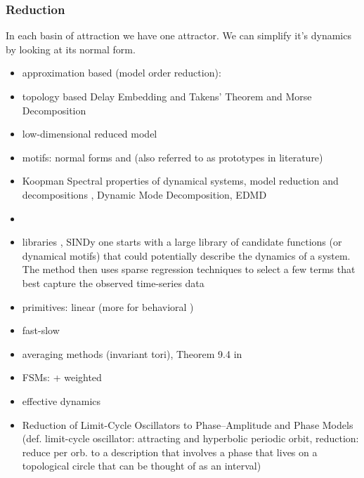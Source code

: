 \documentclass{article}
\theoremstyle{definition} \newtheorem{definition}{Definition}  \newtheorem{example}{Example}
\theoremstyle{remark} \newtheorem{remark}{Remark}
\newcounter{ct}
\begin{document}
\subsubsection{Reduction}\label{sec:reduction} %
In each basin of attraction we have one attractor.
We can simplify it's dynamics by looking at its normal form.

\begin{itemize}
\item approximation based (model order reduction): \citep{schilders2008model}
\item topology based Delay Embedding and Takens' Theorem  and Morse Decomposition 
\item low-dimensional reduced model \citep{zemlianova2024dynamical} \citep{nonnenmacher2017extracting}
\item motifs: normal forms \citep{full1999templates} \citep{nayfeh2011normalforms} and \citep{bonilla2012discriminative} (also referred to as prototypes in literature)
\item Koopman  Spectral properties of dynamical systems, model reduction and decompositions \citep{mezic2005spectral}, Dynamic Mode Decomposition\citep{rowley2009spectral}, EDMD \citep{mezic2005spectral}
\item \citep{rowley2017model}
\item libraries \citep{brunton2014compressive}, SINDy  one starts with a large library of candidate functions (or dynamical motifs) that could potentially describe the dynamics of a system. The method then uses sparse regression techniques to select a few terms that best capture the observed time-series data \citep{brunton2016discovering, brunton2016sparse, fasel2022ensemble}
\item  primitives: linear \citep{kaul2020linear} (more for behavioral \citep{ijspeert2013dynamical})
\item fast-slow \citep{jones1995gspt} \citep{verhulst2006methods}  \citep{dsilva2016data} \citep{haller2017exact}
\item averaging methods \citep{sanders2007averaging} (invariant tori\citep{novaes2024invariant}), Theorem 9.4 in \citep{hoppensteadt2012weakly}
\item FSMs: \citep{giles1991extracting, casey1996dynamics, giles1999equivalence, oliva2019fsm, ceni2020excitable, cotteret2024fsm, aichernig2024learning} + weighted\citep{wei2024weighted}
\item effective dynamics \citep{menier2025interpretable}
\item Reduction of Limit-Cycle Oscillators to Phase–Amplitude and Phase Models \citep{ashwin2016mathematical} (def. limit-cycle oscillator: attracting and hyperbolic periodic orbit, reduction: reduce per orb. to a description that involves a phase that lives on a topological circle that can be thought of as an interval)

\end{itemize}
\end{document}
